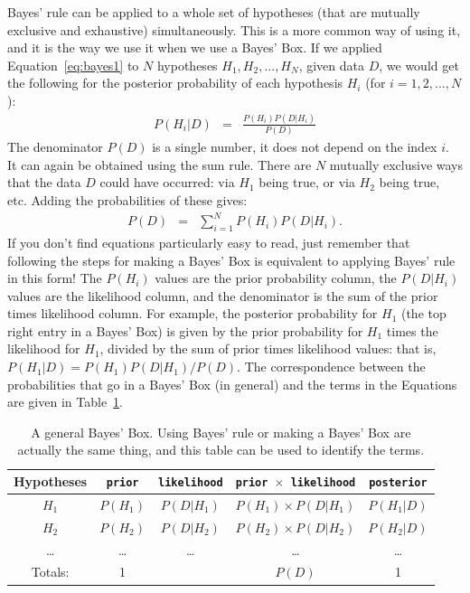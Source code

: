 Bayes' rule can be applied to a whole set
of hypotheses (that are mutually exclusive and exhaustive) simultaneously.
This is a more common way of using it, and it is the way we use it when we use
a Bayes' Box. If we applied Equation~\ref{eq:bayes1} to $N$ hypotheses
$H_1, H_2, ..., H_N$, given data $D$, we would get the following for the posterior
probability of each hypothesis $H_i$ (for $i=1, 2, ..., N$):
\begin{eqnarray}
P(H_i|D) &=& \frac{P(H_i)P(D|H_i)}{P(D)}
\end{eqnarray}
The denominator $P(D)$ is a single number, it does not depend on the index $i$.
It can again be obtained using the sum rule. There are $N$
mutually exclusive ways that the data $D$ could have occurred: via $H_1$ being
true, or via $H_2$ being true, etc. Adding the probabilities of these gives:
\begin{eqnarray}
P(D) &=& \sum_{i=1}^N P(H_i)P(D|H_i).
\end{eqnarray}
If you don't find equations particularly easy to read, just remember that
following the steps for making a Bayes' Box is equivalent to applying
Bayes' rule in this form! The $P(H_i)$ values are the prior probability column, the
$P(D|H_i)$ values are the likelihood column, and the denominator is the
sum of the prior times likelihood column. For example, the posterior probability
for $H_1$ (the top right entry in a Bayes' Box) is given by the prior probability
for $H_1$ times the likelihood for $H_1$, divided by the sum of prior times
likelihood values: that is, $P(H_1|D) = P(H_1)P(D|H_1)/P(D)$.
The correspondence between the probabilities that go in a Bayes'
Box (in general) and the terms in the Equations are given in
Table~\ref{tab:general_bayes_box}.

\begin{table}[ht!]
\begin{center}
\begin{tabular}{|c|c|c|c|c|}
\hline
{\bf Hypotheses} & {\tt prior} & {\tt likelihood} &
{\tt prior $\times$ likelihood} & {\tt posterior}\\
\hline
$H_1$ & $P(H_1)$ & $P(D|H_1)$ & $P(H_1)\times P(D|H_1)$ & $P(H_1|D)$\\
$H_2$ & $P(H_2)$ & $P(D|H_2)$ & $P(H_2)\times P(D|H_2)$ & $P(H_2|D)$\\
\ldots & \ldots & \ldots & \ldots & \ldots\\
\hline
Totals: & 1 & & $P(D)$ & 1\\
\hline
\end{tabular}
\caption{A general Bayes' Box. Using Bayes' rule or making a Bayes' Box are
actually the same thing, and this table can be used to identify the
terms.\label{tab:general_bayes_box}}
\end{center}
\end{table}

